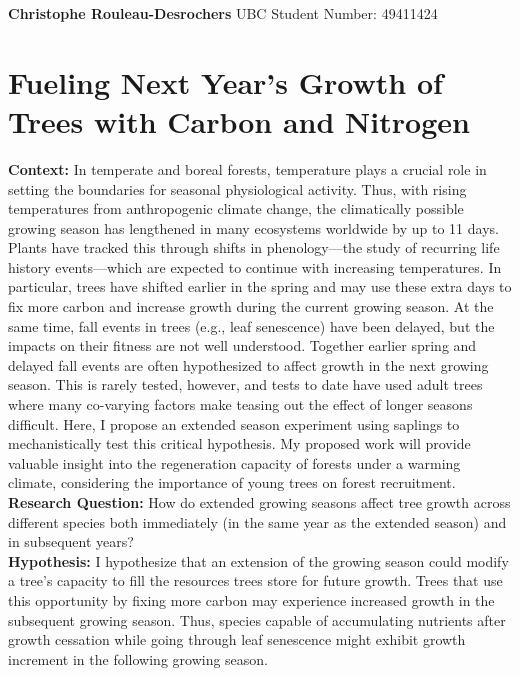 \documentclass[12pt]{article}
\begin{document}
\vspace*{-2cm}
{\small \textbf{Christophe Rouleau-Desrochers} \hfill UBC Student Number: 49411424}
\vspace{0.1cm}

\section*{Fueling Next Year's Growth of Trees with Carbon and Nitrogen}
\textbf {Context:} %
In temperate and boreal forests, temperature plays a crucial role in setting the boundaries for seasonal physiological activity. Thus, with rising temperatures from anthropogenic climate change, the climatically possible growing season has lengthened in many ecosystems worldwide by up to 11 days.\citep{korner_phenology_2010, menzel_growing_1999} Plants have tracked this through shifts in phenology—the study of recurring life history events—which are expected to continue with increasing temperatures.\citep{wolkovich_warming_2012} In particular, trees have shifted earlier in the spring and may use these extra days to fix more carbon and increase growth during the current growing season.\citep{keenan_net_2014, wang_interactive_2020} At the same time, fall events in trees (e.g., leaf senescence) have been delayed, but the impacts on their fitness are not well understood. Together earlier spring and delayed fall events are often hypothesized to affect growth in the next growing season. This is rarely tested, however, and tests to date have used adult trees where many co-varying factors make teasing out the effect of longer seasons difficult. Here, I propose an extended season experiment using saplings to mechanistically test this critical hypothesis. My proposed work will provide valuable insight into the regeneration capacity of forests under a warming climate, considering the importance of young trees on forest recruitment.\citep{zohner_how_2021} \\
\textbf {Research Question:} How do extended growing seasons affect tree growth across different species both immediately (in the same year as the extended season) and in subsequent years? \\
\textbf {Hypothesis:} I hypothesize that an extension of the growing season could modify a tree’s capacity to fill the resources trees store for future growth.\citep{chapin_ecology_1990, lawrence_variable_2018} Trees that use this opportunity by fixing more carbon may experience increased growth in the subsequent growing season.\citep{landhausser_partitioning_2012, martens_first-year_2007} Thus, species capable of accumulating nutrients after growth cessation while going through leaf senescence might exhibit growth increment in the following growing season.\citep{schott_premature_2013} \\
\end{document}
